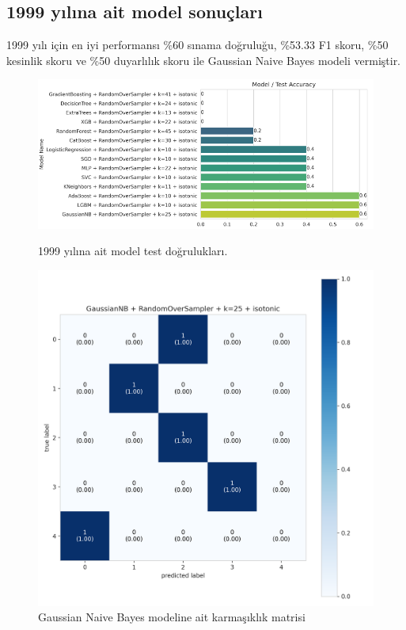 \newpage

\subsection{1999 yılına ait model sonuçları}
1999 yılı için en iyi performansı \%60 sınama doğruluğu,  \%53.33 F1 skoru, \%50 kesinlik skoru ve \%50 duyarlılık skoru ile Gaussian Naive Bayes modeli vermiştir.

\begin{figure}[ht]
\centering
\begin{minipage}[b]{0.6\textwidth}
    \centering
    \includegraphics[width=\textwidth]{1999.png}
    \caption{1999 yılına ait model test doğrulukları.}
    \label{fig:resim1}
\end{minipage}
\hfill
\begin{minipage}[b]{0.6\textwidth}
    \centering
    \includegraphics[width=\textwidth]{1999_cm.png}
    \caption{Gaussian Naive Bayes modeline ait karmaşıklık matrisi}
    \label{fig:resim2}
\end{minipage}
\end{figure}

